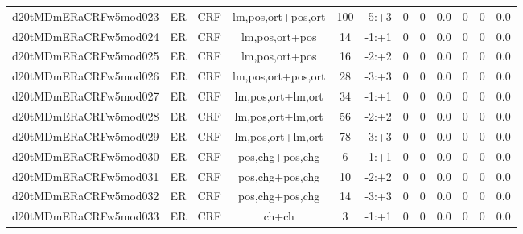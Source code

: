\documentclass[a4paper]{article}
\begin{document}
\begin{landscape}
\begin{center}
\begin{tabular}{ |c|c|c|c|c|c|c|c|c|c|c|c|}
 
 	
 	\small{ d20tMDmERaCRFw5mod023 } & ER & CRF & lm,pos,ort+pos,ort  &  100 &  -5:+3  &  0 & 0 & 0.0  &  0 & 0 & 0.0 \\
 	

 
 	
 	\small{ d20tMDmERaCRFw5mod024 } & ER & CRF & lm,pos,ort+pos  &  14 &  -1:+1  &  0 & 0 & 0.0  &  0 & 0 & 0.0 \\
 	

 
 	
 	\small{ d20tMDmERaCRFw5mod025 } & ER & CRF & lm,pos,ort+pos  &  16 &  -2:+2  &  0 & 0 & 0.0  &  0 & 0 & 0.0 \\
 	

 
 	
 	\small{ d20tMDmERaCRFw5mod026 } & ER & CRF & lm,pos,ort+pos,ort  &  28 &  -3:+3  &  0 & 0 & 0.0  &  0 & 0 & 0.0 \\
 	

 
 	
 	\small{ d20tMDmERaCRFw5mod027 } & ER & CRF & lm,pos,ort+lm,ort  &  34 &  -1:+1  &  0 & 0 & 0.0  &  0 & 0 & 0.0 \\
 	

 
 	
 	\small{ d20tMDmERaCRFw5mod028 } & ER & CRF & lm,pos,ort+lm,ort  &  56 &  -2:+2  &  0 & 0 & 0.0  &  0 & 0 & 0.0 \\
 	

 
 	
 	\small{ d20tMDmERaCRFw5mod029 } & ER & CRF & lm,pos,ort+lm,ort  &  78 &  -3:+3  &  0 & 0 & 0.0  &  0 & 0 & 0.0 \\
 	

 
 	
 	\small{ d20tMDmERaCRFw5mod030 } & ER & CRF & pos,chg+pos,chg  &  6 &  -1:+1  &  0 & 0 & 0.0  &  0 & 0 & 0.0 \\
 	

 
 	
 	\small{ d20tMDmERaCRFw5mod031 } & ER & CRF & pos,chg+pos,chg  &  10 &  -2:+2  &  0 & 0 & 0.0  &  0 & 0 & 0.0 \\
 	

 
 	
 	\small{ d20tMDmERaCRFw5mod032 } & ER & CRF & pos,chg+pos,chg  &  14 &  -3:+3  &  0 & 0 & 0.0  &  0 & 0 & 0.0 \\
 	

 
 	
 	\small{ d20tMDmERaCRFw5mod033 } & ER & CRF & ch+ch  &  3 &  -1:+1  &  0 & 0 & 0.0  &  0 & 0 & 0.0 \\
 	


\end{tabular}
\end{center}
\end{landscape}
\end{document}

